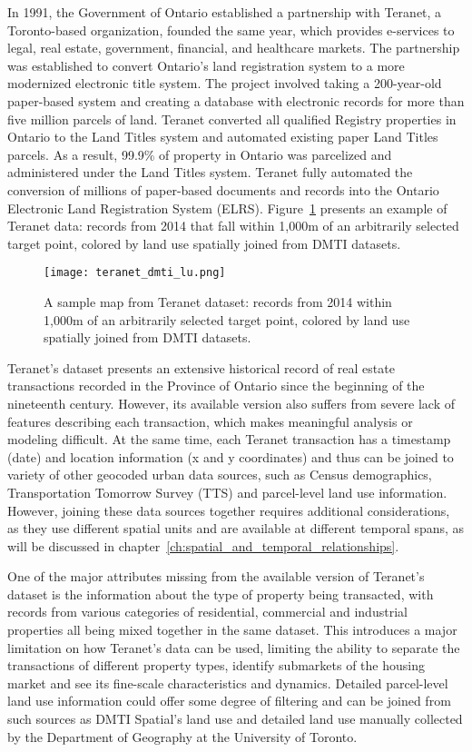 In 1991, the Government of Ontario established a partnership with Teranet, a Toronto-based organization, founded the same year, which provides e-services to legal, real estate, government, financial, and healthcare markets.
The partnership was established to convert Ontario's land registration system to a more modernized electronic title system.
The project involved taking a 200-year-old paper-based system and creating a database with electronic records for more than five million parcels of land.
Teranet converted all qualified Registry properties in Ontario to the Land Titles system and automated existing paper Land Titles parcels.
As a result, 99.9\% of property in Ontario was parcelized and administered under the Land Titles system.
Teranet fully automated the conversion of millions of paper-based documents and records into the Ontario Electronic Land Registration System (ELRS)\cite{TeranetEnterprisesInc.2019}.
Figure~\ref{fig:teranet_dmti_lu} presents an example of Teranet data: records from 2014 that fall within 1,000m of an arbitrarily selected target point, colored by land use spatially joined from DMTI datasets.

\begin{figure}[hbt!]
    \centering
    \texttt{[image: teranet\_dmti\_lu.png]}
    \caption{A sample map from Teranet dataset: records from 2014 within 1,000m of an arbitrarily selected target point, colored by land use spatially joined from DMTI datasets.}
    \label{fig:teranet_dmti_lu}
\end{figure}

Teranet's dataset presents an extensive historical record of real estate transactions recorded in the Province of Ontario since the beginning of the nineteenth century.
However, its available version also suffers from severe lack of features describing each transaction, which makes meaningful analysis or modeling difficult.
At the same time, each Teranet transaction has a timestamp (date) and location information (x and y coordinates) and thus can be joined to variety of other geocoded urban data sources, such as Census demographics, Transportation Tomorrow Survey (TTS) and parcel-level land use information.
However, joining these data sources together requires additional considerations, as they use different spatial units and are available at different temporal spans, as will be discussed in chapter~\ref{ch:spatial_and_temporal_relationships}.

One of the major attributes missing from the available version of Teranet's dataset is the information about the type of property being transacted, with records from various categories of residential, commercial and industrial properties all being mixed together in the same dataset.
This introduces a major limitation on how Teranet's data can be used, limiting the ability to separate the transactions of different property types, identify submarkets of the housing market and see its fine-scale characteristics and dynamics.
Detailed parcel-level land use information could offer some degree of filtering and can be joined from such sources as DMTI Spatial's land use and detailed land use manually collected by the Department of Geography at the University of Toronto.

